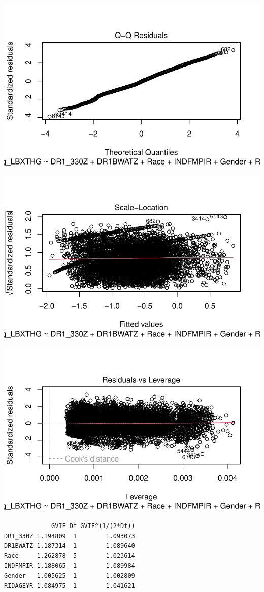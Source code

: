 \documentclass[
  letterpaper,
  DIV=11,
  numbers=noendperiod]{scrartcl}
\begin{document}
\includegraphics{_IDS702_Final_Report_Feedback_files/figure-pdf/unnamed-chunk-22-2.pdf}

\includegraphics{_IDS702_Final_Report_Feedback_files/figure-pdf/unnamed-chunk-22-3.pdf}

\includegraphics{_IDS702_Final_Report_Feedback_files/figure-pdf/unnamed-chunk-22-4.pdf}

\begin{verbatim}
             GVIF Df GVIF^(1/(2*Df))
DR1_330Z 1.194809  1        1.093073
DR1BWATZ 1.187314  1        1.089640
Race     1.262878  5        1.023614
INDFMPIR 1.188065  1        1.089984
Gender   1.005625  1        1.002809
RIDAGEYR 1.084975  1        1.041621
\end{verbatim}
\end{document}
